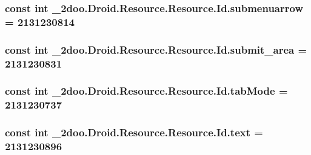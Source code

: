 \hypertarget{class__2doo_1_1_droid_1_1_resource_1_1_id_b3ad34b0abf8996363cd098790a6a7f2}{
\subsubsection[{submenuarrow}]{\setlength{\rightskip}{0pt plus 5cm}const int \_\-2doo.Droid.Resource.Resource.Id.submenuarrow = 2131230814}}
\label{class__2doo_1_1_droid_1_1_resource_1_1_id_b3ad34b0abf8996363cd098790a6a7f2}


\hypertarget{class__2doo_1_1_droid_1_1_resource_1_1_id_49abf8eaeb6186f932f39bad99ecd834}{
\subsubsection[{submit\_\-area}]{\setlength{\rightskip}{0pt plus 5cm}const int \_\-2doo.Droid.Resource.Resource.Id.submit\_\-area = 2131230831}}
\label{class__2doo_1_1_droid_1_1_resource_1_1_id_49abf8eaeb6186f932f39bad99ecd834}


\hypertarget{class__2doo_1_1_droid_1_1_resource_1_1_id_d74d5176237047d4715fc38da6a55542}{
\subsubsection[{tabMode}]{\setlength{\rightskip}{0pt plus 5cm}const int \_\-2doo.Droid.Resource.Resource.Id.tabMode = 2131230737}}
\label{class__2doo_1_1_droid_1_1_resource_1_1_id_d74d5176237047d4715fc38da6a55542}


\hypertarget{class__2doo_1_1_droid_1_1_resource_1_1_id_91e9a1bbe4abf20953ff3b84eded2def}{
\subsubsection[{text}]{\setlength{\rightskip}{0pt plus 5cm}const int \_\-2doo.Droid.Resource.Resource.Id.text = 2131230896}}
\label{class__2doo_1_1_droid_1_1_resource_1_1_id_91e9a1bbe4abf20953ff3b84eded2def}


